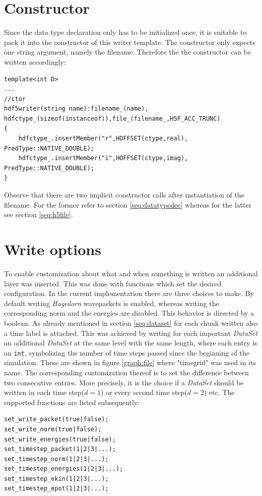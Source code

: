 \section{Constructor}
\label{seq:ctor}
Since the data type declaration only has to be initialized once, it is suitable to pack it into the constructor of this writer template. The constructor only expects one string argument, namely the filename. Therefore the the constructor can be written accordingly:
\begin{lstlisting}
template<int D>
...
//ctor
hdf5writer(string name):filename_(name), hdfctype_(sizeof(instanceof)),file_(filename_,H5F_ACC_TRUNC)
{
	hdfctype_.insertMember("r",HOFFSET(ctype,real), PredType::NATIVE_DOUBLE);
	hdfctype_.insertMember("i",HOFFSET(ctype,imag), PredType::NATIVE_DOUBLE);
}
\end{lstlisting}
Observe that there are two implicit constructor calls after instantiation of the filename. For the former refer to section \ref{seq:datatypedec} whereas for the latter see section \ref{seq:h5file}.

\section{Write options}
To enable customization about what and when something is written an additional layer was inserted. This was done with functions which set the desired configuration. In the current implementation there are three choices to make. By default writing \textit{Hagedorn} wavepackets is enabled, whereas writing the corresponding norm and the energies are disabled. This behavior is directed by a boolean. As already mentioned in section \ref{seq:dataset} for each chunk written also a time label is attached. This was achieved by writing for each important \textit{DataSet} an additional \textit{DataSet} at the same level with the same length, where each entry is an \texttt{int}, symbolizing the number of time steps passed since the beginning of the simulation. These are shown in figure \ref{graph:file} where "timegrid" was used in its name. The corresponding customization thereof is to set the difference between two consecutive entries. More precisely, it is the choice if a \textit{DataSet} should be written in each time step($d=1$) or every second time step($d=2$) etc. The supported functions are listed subsequently:
\begin{lstlisting}
set_write_packet(true|false);
set_write_norm(true|false);
set_write_energies(true|false);
set_timestep_packet(1|2|3|...);
set_timestep_norm(1|2|3|...);
set_timestep_energies(1|2|3|...);
set_timestep_ekin(1|2|3|...);
set_timestep_epot(1|2|3|...);
\end{lstlisting}


